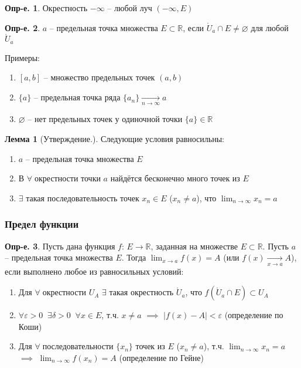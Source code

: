\documentclass[a4paper,12pt]{article}
\numberwithin{figure}{section}
\theoremstyle{definition}
\newtheorem{definition}{Опр-е.}[section]
\theoremstyle{definition}
\newtheorem{lemma}{Лемма}[section]
\def\.{\;\;}
\def\eps{\varepsilon}
\def\ntoinf{n \to \infty}
\def\ringU{\mathring{U}}
\def\mathR{\mathbb{R}}
\def\any {$\forall\;$}
\begin{document}
\begin{definition} Окрестность $-\infty$ -- любой луч $(-\infty,E)$ \end{definition}

\begin{definition}
	$a$ -- предельная точка множества $E \subset \mathR$,
	если $\ringU_a \cap E \neq \varnothing$ для любой $\ringU_a$
\end{definition}

\bigbreak
Примеры:\begin{enumerate}
	\item $[a,b]$ -- множество предельных точек $(a,b)$
	\item $\{a\}$ -- предельная точка ряда $\{a_n\}\xrightarrow[\ntoinf]{}a$
	\item $\varnothing$ -- нет предельных точек у одиночной точки $\{a\} \in \mathR$
\end{enumerate}

\begin{lemma}[Утверждение.]
  Следующие условия равносильны:
  \begin{enumerate}
	\item $a$ -- предельная точка множества $E$
	\item В \any окрестности точки $a$ найдётся бесконечно много точек из $E$
	\item $\exists$ такая последовательность точек $x_n \in E$ ($x_n \neq a$),
		  что $\displaystyle \lim_{\ntoinf}x_n=a$
  \end{enumerate}
\end{lemma}

\subsubsection{Предел функции}

\begin{definition}
	Пусть дана функция $f$: $E\to\mathR$, заданная на множестве $E \subset \mathR$.
	Пусть $a$ -- предельная точка множества $E$.
	Тогда $\displaystyle \lim_{x \to a}f(x)=A$ (или $f(x) \xrightarrow[x \to a]{} A$),
	если выполнено любое из равносильных условий:
	\begin{enumerate}
		\item Для \any окрестности $U_A$ $\exists$ такая окрестность $\ringU_a$,
			  что $f(\ringU_a \cap E) \subset U_A$
		\item $\forall \eps>0 \. \exists \delta>0 \. \forall x \in E$,
			  т.ч. $x \ne a$ $\implies$ $\left|f(x)-A\right|<\eps$
			  (определение по Коши)
		\item Для \any последовательности $\{x_n\}$ точек из $E$ ($x_n\ne a$),
			  т.ч. $\displaystyle \lim_{\ntoinf}x_n = a$
			  $\implies$ $\displaystyle \lim_{\ntoinf}f(x_n) = A$
			  (определение по Гейне)
	\end{enumerate}
\end{definition}
\end{document}
